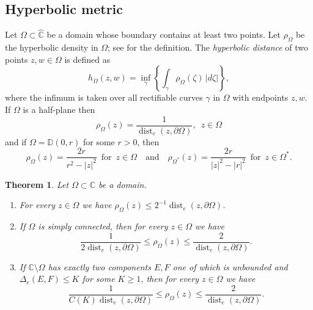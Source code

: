 \documentclass[letterpaper]{amsart}
\theoremstyle{plain}
\newtheorem{theorem}{Theorem}
\theoremstyle{definition}
\theoremstyle{remark}
\numberwithin{equation}{section}
\numberwithin{theorem}{section}
\newcommand{\C}{\mathbb C}
\newcommand{\D}{\mathbb D}
\DeclareMathOperator{\dist}{dist}
\begin{document}
\subsection{Hyperbolic metric}

Let $\Omega\subset \widehat{\C}$ be a domain whose boundary contains at least two points. Let $\rho_\Omega$ be the hyperbolic density in $\Omega$; see \cite{BeardonMinda:hyperbolic} for the definition. The \textit{hyperbolic distance} of two points $z,w\in \Omega$ is defined as 
$$h_\Omega(z,w)=\inf_\gamma \left\{ \int_\gamma \rho_\Omega(\zeta)\,|d\zeta| \right\},$$
where the infimum is taken over all rectifiable curves $\gamma$ in $\Omega$ with endpoints $z,w$.   If $\Omega$ is a half-plane then  
$$\rho_\Omega(z)= \frac{1}{\dist_e(z,\partial \Omega)},\,\,\,z\in \Omega$$
and if $\Omega=\D(0,r)$ for some $r>0$, then
$$\rho_\Omega(z)= \frac{2r}{r^2-|z|^2}\,\,\, \text{for}\,\,\,z\in \Omega\quad \text{and}\quad \rho_{\Omega^*}(z)= \frac{2r}{|z|^2-|r|^2}\,\,\, \text{for}\,\,\,z\in \Omega^*.$$

\begin{theorem}\label{theorem:hyperbolic_distance}
Let $\Omega\subset \C$ be a domain.
\begin{enumerate}[label=\normalfont(\arabic*)]
\item For every $z\in \Omega$ we have $\rho_\Omega(z) \leq 2^{-1}{\dist_e(z,\partial \Omega)}$.
\item If $\Omega$ is simply connected, then for every $z\in \Omega$ we have 
$$\frac{1}{2\dist_e(z,\partial \Omega)} \leq \rho_\Omega(z)\leq  \frac{2}{\dist_e(z,\partial \Omega)}.$$
\item If $\C\setminus \Omega$ has exactly two components $E,F$ one of which is unbounded and $\Delta_e(E,F)\leq K$ for some $K\geq 1$, then for every $z\in \Omega$ we have
$$\frac{1}{C(K)\dist_e(z,\partial \Omega)} \leq \rho_\Omega(z) \leq  \frac{2}{\dist_e(z,\partial \Omega)}.$$
\end{enumerate}
\end{theorem}
\end{document}
